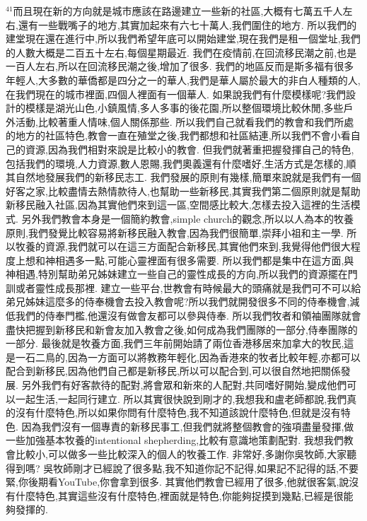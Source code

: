 \documentclass{book}
\begin{document}
$^{41}$而且現在新的方向就是城市應該在路邊建立一些新的社區,大概有七萬五千人左右,還有一些戰嘴子的地方,其實加起來有六七十萬人,我們圍住的地方.
所以我們的建堂現在還在進行中,所以我們希望年底可以開始建堂,現在我們是租一個堂址,我們的人數大概是二百五十左右,每個星期最近.
我們在疫情前,在回流移民潮之前,也是一百人左右,所以在回流移民潮之後,增加了很多.
我們的地區反而是斯多福有很多年輕人,大多數的華僑都是四分之一的華人,我們是華人屬於最大的非白人種類的人,在我們現在的城市裡面,四個人裡面有一個華人.
如果說我們有什麼模樣呢?我們設計的模樣是湖光山色,小鎮風情,多人多事的後花園,所以整個環境比較休閒,多些戶外活動,比較著重人情味,個人關係那些.
所以我們自己就看我們的教會和我們所處的地方的社區特色,教會一直在殖堂之後,我們都想和社區結連,所以我們不會小看自己的資源,因為我們相對來說是比較小的教會.
但我們就著重把握發揮自己的特色,包括我們的環境,人力資源,數人恩賜,我們奧義還有什麼嗜好,生活方式是怎樣的,順其自然地發展我們的新移民志工.
我們發展的原則有幾樣,簡單來說就是我們有一個好客之家,比較盡情去熱情款待人,也幫助一些新移民,其實我們第二個原則就是幫助新移民融入社區,因為其實他們來到這一區,空間感比較大,怎樣去投入這裡的生活模式.
另外我們教會本身是一個簡約教會,simple church的觀念,所以以人為本的牧養原則,我們發覺比較容易將新移民融入教會,因為我們很簡單,崇拜小祖和主一學.
所以牧養的資源,我們就可以在這三方面配合新移民,其實他們來到,我覺得他們很大程度上想和神相遇多一點,可能心靈裡面有很多需要.
所以我們都是集中在這方面,與神相遇,特別幫助弟兄姊妹建立一些自己的靈性成長的方向,所以我們的資源擺在門訓或者靈性成長那裡.
建立一些平台,世教會有時候最大的頭痛就是我們可不可以給弟兄姊妹這麼多的侍奉機會去投入教會呢?所以我們就開發很多不同的侍奉機會,減低我們的侍奉門檻,他還沒有做會友都可以參與侍奉.
所以我們牧者和領袖團隊就會盡快把握到新移民和新會友加入教會之後,如何成為我們團隊的一部分,侍奉團隊的一部分.
最後就是牧養方面,我們三年前開始請了兩位香港移居來加拿大的牧民,這是一石二鳥的,因為一方面可以將教務年輕化,因為香港來的牧者比較年輕,亦都可以配合到新移民,因為他們自己都是新移民,所以可以配合到,可以很自然地把關係發展.
另外我們有好客款待的配對,將會眾和新來的人配對,共同嗜好開始,變成他們可以一起生活,一起同行建立.
所以其實很快說到剛才的,我想我和盧老師都說,我們真的沒有什麼特色,所以如果你問有什麼特色,我不知道該說什麼特色,但就是沒有特色.
因為我們沒有一個專責的新移民事工,但我們就將整個教會的強項盡量發揮,做一些加強基本牧養的intentional shepherding,比較有意識地策劃配對.
我想我們教會比較小,可以做多一些比較深入的個人的牧養工作.
非常好,多謝你吳牧師,大家聽得到嗎? 吳牧師剛才已經說了很多點,我不知道你記不記得,如果記不記得的話,不要緊,你後期看YouTube,你會拿到很多.
其實他們教會已經用了很多,他就很客氣,說沒有什麼特色,其實這些沒有什麼特色,裡面就是特色,你能夠捉摸到幾點,已經是很能夠發揮的.
\end{document}
